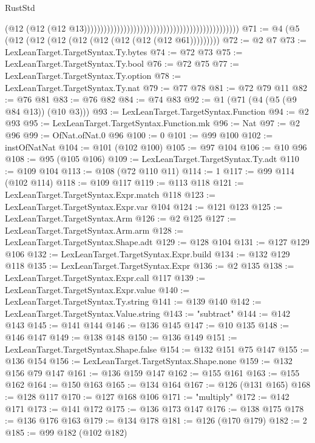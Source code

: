 \begin{lexlean}{RustStd}
\begin{coremodule}
                                                                                            (@12
                                                                                              (@12
                                                                                                (@12
                                                                                                  @13)))))))))))))))))))))))))))))))))))))))))))))))
@71 := @4 (@5 (@12 (@12 (@12 (@12 (@12 (@12 (@12 (@12 @61)))))))))
@72 := @2 @7
@73 := LexLeanTarget.TargetSyntax.Ty.bytes
@74 := @72 @73
@75 := LexLeanTarget.TargetSyntax.Ty.bool
@76 := @72 @75
@77 := LexLeanTarget.TargetSyntax.Ty.option
@78 := LexLeanTarget.TargetSyntax.Ty.nat
@79 := @77 @78
@81 := @72 @79 @11
@82 := @76 @81
@83 := @76 @82
@84 := @74 @83
@92 := @1 (@71 (@4 (@5 (@9 @84 @13)) (@10 @3)))
@93 := LexLeanTarget.TargetSyntax.Function
@94 := @2 @93
@95 := LexLeanTarget.TargetSyntax.Function.mk
@96 := Nat
@97 := @2 @96
@99 := OfNat.ofNat.{0} @96
@100 := 0
@101 := @99 @100
@102 := instOfNatNat
@104 := @101 (@102 @100)
@105 := @97 @104
@106 := @10 @96
@108 := @95 (@105 @106)
@109 := LexLeanTarget.TargetSyntax.Ty.adt
@110 := @109 @104
@113 := @108 (@72 @110 @11)
@114 := 1
@117 := @99 @114 (@102 @114)
@118 := @109 @117
@119 := @113 @118
@121 := LexLeanTarget.TargetSyntax.Expr.match @118
@123 := LexLeanTarget.TargetSyntax.Expr.var @104
@124 := @121 @123
@125 := LexLeanTarget.TargetSyntax.Arm
@126 := @2 @125
@127 := LexLeanTarget.TargetSyntax.Arm.arm
@128 := LexLeanTarget.TargetSyntax.Shape.adt
@129 := @128 @104
@131 := @127 @129 @106
@132 := LexLeanTarget.TargetSyntax.Expr.build
@134 := @132 @129 @118
@135 := LexLeanTarget.TargetSyntax.Expr
@136 := @2 @135
@138 := LexLeanTarget.TargetSyntax.Expr.call @117
@139 := LexLeanTarget.TargetSyntax.Expr.value
@140 := LexLeanTarget.TargetSyntax.Ty.string
@141 := @139 @140
@142 := LexLeanTarget.TargetSyntax.Value.string
@143 := "subtract"
@144 := @142 @143
@145 := @141 @144
@146 := @136 @145
@147 := @10 @135
@148 := @146 @147
@149 := @138 @148
@150 := @136 @149
@151 := LexLeanTarget.TargetSyntax.Shape.false
@154 := @132 @151 @75 @147
@155 := @136 @154
@156 := LexLeanTarget.TargetSyntax.Shape.none
@159 := @132 @156 @79 @147
@161 := @136 @159 @147
@162 := @155 @161
@163 := @155 @162
@164 := @150 @163
@165 := @134 @164
@167 := @126 (@131 @165)
@168 := @128 @117
@170 := @127 @168 @106
@171 := "multiply"
@172 := @142 @171
@173 := @141 @172
@175 := @136 @173 @147
@176 := @138 @175
@178 := @136 @176 @163
@179 := @134 @178
@181 := @126 (@170 @179)
@182 := 2
@185 := @99 @182 (@102 @182)

\end{coremodule}
\end{lexlean}
